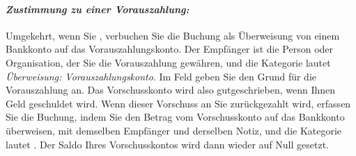 \paragraph{\textsl{Zustimmung zu einer Vorauszahlung:}} Umgekehrt, wenn Sie , verbuchen Sie die Buchung als Überweisung von einem Bankkonto auf das Vorauszahlungskonto. Der Empfänger ist die Person oder Organisation, der Sie die Vorauszahlung gewähren, und die Kategorie lautet \emph{Überweisung: Vorauszahlungskonto}. Im Feld  geben Sie den Grund für die Vorauszahlung an. Das Vorschusskonto wird also gutgeschrieben, wenn Ihnen Geld geschuldet wird. Wenn dieser Vorschuss an Sie zurückgezahlt wird, erfassen Sie die Buchung, indem Sie den Betrag vom Vorschusskonto auf das Bankkonto überweisen, mit demselben Empfänger und derselben Notiz, und die Kategorie lautet . Der Saldo Ihres Vorschusskontos wird dann wieder auf Null gesetzt.

